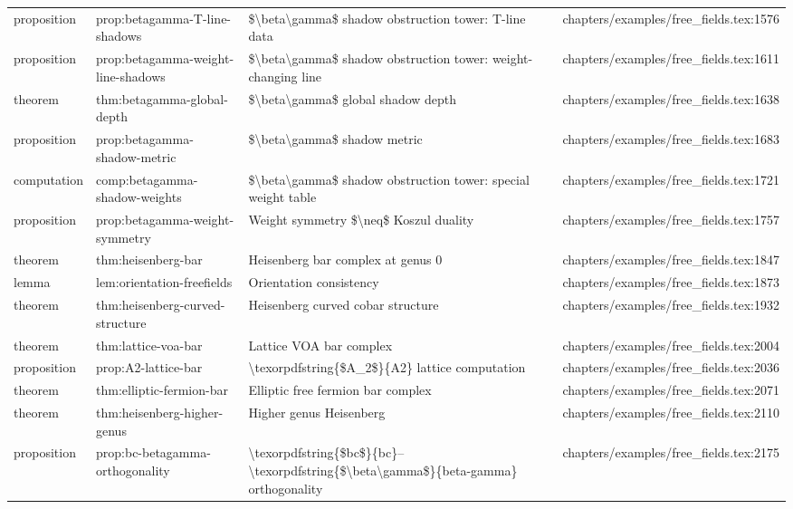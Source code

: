 \documentclass[11pt]{article}
\begin{document}
\begin{longtable}{L{0.10\textwidth}L{0.26\textwidth}L{0.42\textwidth}L{0.22\textwidth}}
proposition & prop:betagamma-T-line-shadows & \$\textbackslash{}beta\textbackslash{}gamma\$ shadow obstruction tower: T-line data & chapters/examples/free\_fields.tex:1576\\
proposition & prop:betagamma-weight-line-shadows & \$\textbackslash{}beta\textbackslash{}gamma\$ shadow obstruction tower: weight-changing line & chapters/examples/free\_fields.tex:1611\\
theorem & thm:betagamma-global-depth & \$\textbackslash{}beta\textbackslash{}gamma\$ global shadow depth & chapters/examples/free\_fields.tex:1638\\
proposition & prop:betagamma-shadow-metric & \$\textbackslash{}beta\textbackslash{}gamma\$ shadow metric & chapters/examples/free\_fields.tex:1683\\
computation & comp:betagamma-shadow-weights & \$\textbackslash{}beta\textbackslash{}gamma\$ shadow obstruction tower: special weight table & chapters/examples/free\_fields.tex:1721\\
proposition & prop:betagamma-weight-symmetry & Weight symmetry \$\textbackslash{}neq\$ Koszul duality & chapters/examples/free\_fields.tex:1757\\
theorem & thm:heisenberg-bar & Heisenberg bar complex at genus 0 & chapters/examples/free\_fields.tex:1847\\
lemma & lem:orientation-freefields & Orientation consistency & chapters/examples/free\_fields.tex:1873\\
theorem & thm:heisenberg-curved-structure & Heisenberg curved cobar structure & chapters/examples/free\_fields.tex:1932\\
theorem & thm:lattice-voa-bar & Lattice VOA bar complex & chapters/examples/free\_fields.tex:2004\\
proposition & prop:A2-lattice-bar & \textbackslash{}texorpdfstring\{\$A\_2\$\}\{A2\} lattice computation & chapters/examples/free\_fields.tex:2036\\
theorem & thm:elliptic-fermion-bar & Elliptic free fermion bar complex & chapters/examples/free\_fields.tex:2071\\
theorem & thm:heisenberg-higher-genus & Higher genus Heisenberg & chapters/examples/free\_fields.tex:2110\\
proposition & prop:bc-betagamma-orthogonality & \textbackslash{}texorpdfstring\{\$bc\$\}\{bc\}--\textbackslash{}texorpdfstring\{\$\textbackslash{}beta\textbackslash{}gamma\$\}\{beta-gamma\} orthogonality & chapters/examples/free\_fields.tex:2175\\

\end{longtable}
\end{document}

